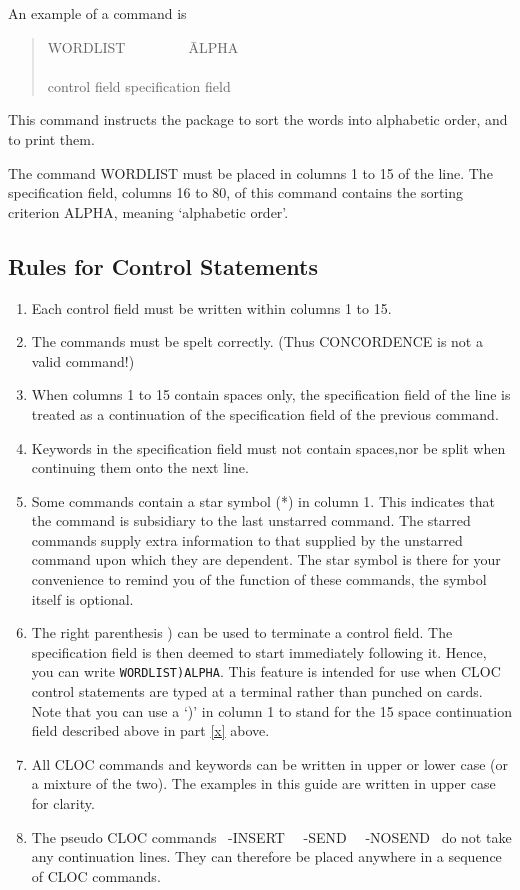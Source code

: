 An example of a command is
\begin{quote}
\begin{tabbing}
WORDLIST~~~~~~~~~\=ALPHA\\
\\
control field    \>specification field
\end{tabbing}
\end{quote}
This command instructs the package to sort the
words into alphabetic order, and to print them.

The command WORDLIST must be placed in columns 1 to 15 of the line.
The specification field, columns 16 to 80, of
this command contains the sorting criterion ALPHA,
meaning `alphabetic order'.

\subsection{Rules for Control Statements}
\begin{enumerate}
\item Each control field must be written within columns 1 to 15.
\item The commands must be spelt correctly.
      (Thus CONCORDENCE is not a valid command!)
\item \label{x} When columns 1 to 15 contain spaces only, the specification
      field of the line is treated as a continuation of the
      specification field of the previous command.
\item Keywords in the specification field must not contain
      spaces,nor be split when continuing them onto the next
      line.
\item Some commands contain a star symbol (*) in column 1.
      This indicates that the command is subsidiary to the
      last unstarred command.  The starred commands
      supply extra information to that supplied by the unstarred
      command upon which they are dependent.
      The star symbol is there for your convenience to remind you of
      the function of these commands, the symbol itself is optional.
\item The right parenthesis ) can be used to terminate a control field.
      The specification field is then deemed to start
      immediately following it.  Hence, you can write
      \verb/WORDLIST)ALPHA/.  This feature is intended for use when
      CLOC control statements are typed at a terminal rather than
      punched on cards.  Note that you can use a `)' in column 1
      to stand for the 15 space continuation field described above
      in part \ref{x} above.
\item All CLOC commands and keywords can be written in upper
      or lower case (or a mixture of the two). The examples in this
      guide are written in upper case for clarity.
\item The pseudo CLOC commands ~-INSERT~ ~-SEND~ ~-NOSEND~ do not take
      any continuation lines. They can therefore be placed anywhere
      in a sequence of CLOC commands.
\end{enumerate}

